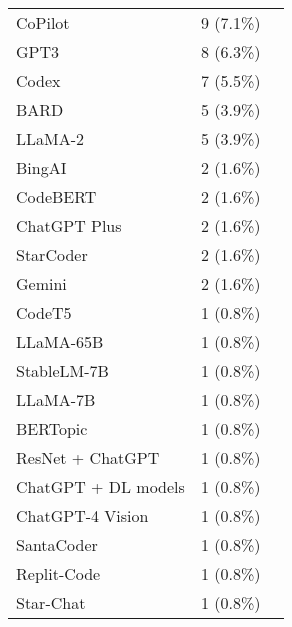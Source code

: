 \begin{table}[ht]
\begin{tabular}{l c p{4cm}}
		CoPilot & 9 (7.1\%) & \cite{denny2023conversing,lau2023ban,prather2023robots,cambaz2024use,venkatesh2023evaluating,rasnayaka2024empirical,bien2024generative,tanay2024exploratory,arora2024analyzing} \\
		GPT3 & 8 (6.3\%) & \cite{li2023potential,cao2023scaffolding,cipriano2023gpt3,balse2023investigating,prather2023robots,liffiton2024codehelp,cipriano2024llms,prakash2024integrating} \\
		Codex & 7 (5.5\%) & \cite{sarsa2022automatic,kazemitabaar2023studying,macneil2023experiences,nguyen2024beginning,cambaz2024use,kazemitabaar2024novices,drori2023human} \\
		BARD & 5 (3.9\%) & \cite{estevezayres2024evaluation,cambaz2024use,cipriano2024llms,dengel2023qualitative,agarwal2024which} \\
		LLaMA-2 & 5 (3.9\%) & \cite{padiyath2024insights,prakash2024integrating,oli2024automated,xiao2024qacp,raihan2024cseprompts} \\
		BingAI & 2 (1.6\%) & \cite{kruger2024performance,arora2024analyzing} \\
		CodeBERT & 2 (1.6\%) & \cite{wan2024automated,oli2024automated} \\
		ChatGPT Plus & 2 (1.6\%) & \cite{padiyath2024insights,rasnayaka2024empirical} \\
		StarCoder & 2 (1.6\%) & \cite{babe2023studenteval,raihan2024cseprompts} \\
		Gemini & 2 (1.6\%) & \cite{xiao2024qacp,arora2024analyzing} \\
		CodeT5 & 1 (0.8\%) & \cite{koutcheme2023training} \\
		LLaMA-65B & 1 (0.8\%) & \cite{kruger2024performance} \\
		StableLM-7B & 1 (0.8\%) & \cite{kruger2024performance} \\
		LLaMA-7B & 1 (0.8\%) & \cite{kruger2024performance} \\
		BERTopic & 1 (0.8\%) & \cite{sterbini2024automated} \\
		ResNet + ChatGPT & 1 (0.8\%) & \cite{wang2024enhancing} \\
		ChatGPT + DL models & 1 (0.8\%) & \cite{hoq2024detecting} \\
		ChatGPT-4 Vision & 1 (0.8\%) & \cite{mendoncca2024evaluating} \\
		SantaCoder & 1 (0.8\%) & \cite{babe2023studenteval} \\
		Replit-Code & 1 (0.8\%) & \cite{babe2023studenteval} \\
		Star-Chat & 1 (0.8\%) & \cite{babe2023studenteval} \\

\end{tabular}
\end{table}

